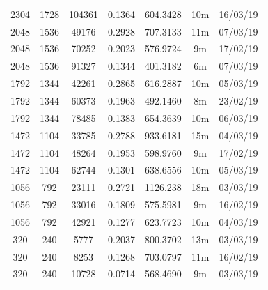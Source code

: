 \documentclass[11pt,a4paper]{report}
\begin{document}
\begin{itemize}
\begin{center}
\begin{tabular}{ c c c | c | c c c }
  2304 & 1728 & 104361 & 0.1364 & 604.3428 & 10m & 16/03/19 \\
  2048 & 1536 & 49176 & 0.2928 & 707.3133 & 11m & 07/03/19 \\
  2048 & 1536 & 70252 & 0.2023 & 576.9724 & 9m & 17/02/19 \\
  2048 & 1536 & 91327 & 0.1344 & 401.3182 & 6m & 07/03/19 \\
  1792 & 1344 & 42261 & 0.2865 & 616.2887 & 10m & 05/03/19 \\
  1792 & 1344 & 60373 & 0.1963 & 492.1460 & 8m & 23/02/19 \\
  1792 & 1344 & 78485 & 0.1383 & 654.3639 & 10m & 06/03/19 \\
  1472 & 1104 & 33785 & 0.2788 & 933.6181 & 15m & 04/03/19 \\
  1472 & 1104 & 48264 & 0.1953 & 598.9760 & 9m & 17/02/19 \\
  1472 & 1104 & 62744 & 0.1301 & 638.6556 & 10m & 05/03/19 \\
  1056 & 792 & 23111 & 0.2721 & 1126.238 & 18m & 03/03/19 \\
  1056 & 792 & 33016 & 0.1809 & 575.5981 & 9m & 16/02/19 \\
  1056 & 792 & 42921 & 0.1277 & 623.7723 & 10m & 04/03/19 \\
  320 & 240 & 5777 & 0.2037 & 800.3702 & 13m & 03/03/19 \\
  320 & 240 & 8253 & 0.1268 & 703.0797 & 11m & 16/02/19 \\
  320 & 240 & 10728 & 0.0714 & 568.4690 & 9m & 03/03/19 \\
  \end{tabular}
  \end{center}


\end{itemize}
\end{document}

